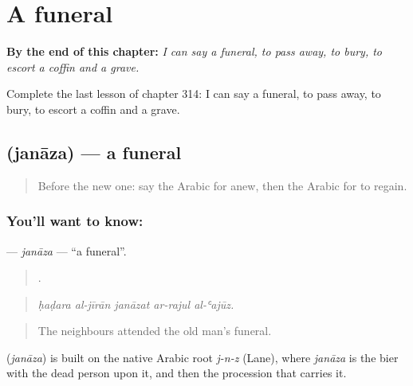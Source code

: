 
\chapter{A funeral}
\label{ch:ar-a-funeral}

\begin{chapteropening}
\textbf{By the end of this chapter:} \emph{I can say a funeral, to pass away, to bury, to escort a coffin and a grave.}

Complete the last lesson of chapter 314: I can say a funeral, to pass away, to bury, to escort a coffin and a grave.
\end{chapteropening}

\section[\texorpdfstring{\ar{جنازة} (janāza)}{جنازة (janāza)}]{ (janāza) — a funeral}

\label{lesson:AR-C314-janaza}



\begin{quote}
Before the new one: say the Arabic for anew, then the Arabic for to regain.
\end{quote}

\subsection*{You'll want to know: }
\textbf{} — \emph{janāza} — \textquotedblleft{}a funeral\textquotedblright{}.

\begin{quote}
    .
\end{quote}

\begin{quote}
\emph{ḥaḍara al-jīrān janāzat ar-rajul al-ʿajūz.}
\end{quote}

\begin{quote}
The neighbours attended the old man’s funeral.
\end{quote}

\begin{cousinweb}
\textbf{} (\emph{janāza}) is built on the native Arabic root \emph{j-n-z} (Lane), where \emph{janāza} is the bier with the dead person upon it, and then the procession that carries it.
\end{cousinweb}

